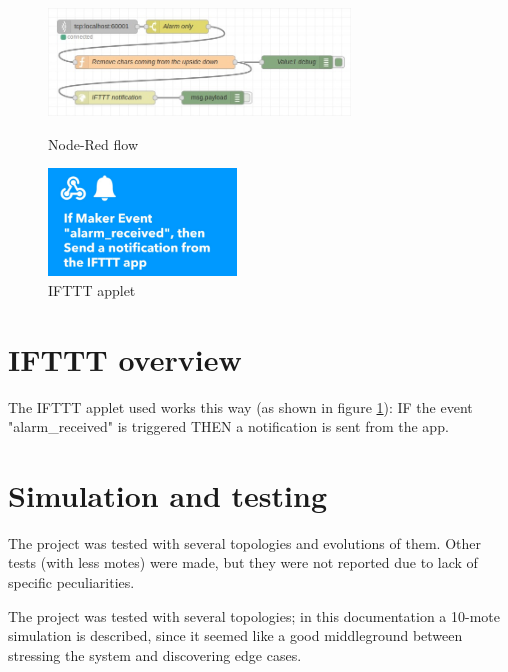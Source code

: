 \documentclass[11pt]{article}
\begin{document}
\begin{figure}[H]
  \begin{minipage}{0.6\textwidth}
    \includegraphics[height=108px]{Node-red-flow}
    \caption{Node-Red flow}
    \label{nodered}
  \end{minipage}
  \begin{minipage}{0.39\textwidth}
    \includegraphics[height=108px]{ifttt-screenshot}
    \caption{IFTTT applet}
    \label{ifttt}
  \end{minipage}
\end{figure}

\section{IFTTT overview}
The IFTTT applet used works this way (as shown in figure \ref{ifttt}): \newline
IF the event "alarm\_received" is triggered \newline
THEN a notification is sent from the app. \newline

\section{Simulation and testing}
The project was tested with several topologies and evolutions of them. Other tests (with less motes) were made, but they were not reported due to lack of specific peculiarities. \newline

The project was tested with several topologies; in this documentation a 10-mote simulation is described, since it seemed like a good middleground between stressing the system and discovering edge cases.

%
\end{document}
